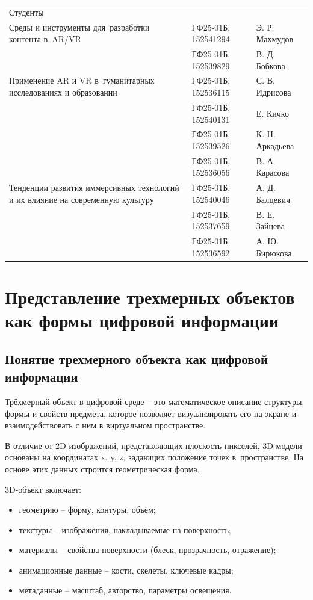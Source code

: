 \documentclass{ou}
\begin{document}
\begin{flushleft}
\doublespacing
\begin{tabularx}{\textwidth}{@{} p{} l l @{}}
Студенты     &                     &         \\
\multirow{-2.27}{\hsize}{\singlespacing Среды и инструменты для~разработки контента в~AR/VR}
             & ГФ25-01Б, 152541294 & Э. Р. Махмудов\\
             & ГФ25-01Б, 152539829 & В. Д. Бобкова\\
\multirow{-2.27}{\hsize}{\singlespacing Применение AR и VR в~гуманитарных исследованиях и образовании}
             & ГФ25-01Б, 152536115 & С. В. Идрисова\\
             & ГФ25-01Б, 152540131 & Е. Кичко\\
             & ГФ25-01Б, 152539526 & К. Н. Аркадьева\\
             & ГФ25-01Б, 152536056 & В. А. Карасова\\
\multirow{-2.27}{\hsize}{\singlespacing Тенденции развития иммерсивных технологий и их влияние на современную культуру}
             & ГФ25-01Б, 152540046 & А. Д. Балцевич\\
             & ГФ25-01Б, 152537659 & В. Е. Зайцева\\
             & ГФ25-01Б, 152536592 & А. Ю. Бирюкова\\   
\end{tabularx}
\end{flushleft}
\newpage
{
\sloppy
\tableofcontents
}
\newpage
\onehalfspacing
\section{Представление трехмерных объектов как формы цифровой информации}
\subsection{Понятие трехмерного объекта как цифровой информации}
Трёхмерный объект в цифровой среде -- это математическое описание структуры, формы и свойств предмета, которое позволяет визуализировать его на экране и взаимодействовать с ним в виртуальном пространстве.

В отличие от 2D-изображений, представляющих плоскость пикселей, 3D-модели основаны на координатах x, y, z, задающих положение точек в~пространстве. На основе этих данных строится геометрическая форма.

3D-объект включает:
\begin{itemize}[label=-, leftmargin=0em, itemindent=3.35em, nosep]
\item геометрию -- форму, контуры, объём;
\item текстуры -- изображения, накладываемые на поверхность;
\item материалы -- свойства поверхности (блеск, прозрачность, отражение);
\item анимационные данные -- кости, скелеты, ключевые кадры;
\item метаданные -- масштаб, авторство, параметры освещения.
\end{itemize}
\end{document}
